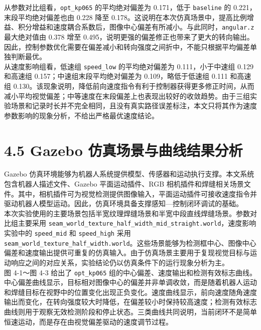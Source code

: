 \documentclass[UTF8,a4paper,12pt]{ctexrep}
\begin{document}
从参数对比组看，\texttt{opt\_kp065} 的平均绝对偏差为 0.171，低于 \texttt{baseline} 的 0.221，末段平均绝对偏差也由 0.228 降至 0.178。这说明在本次仿真场景中，提高比例增益、积分增益和速度耦合系数后，图像中心偏差有所减小。与此同时，\texttt{angular.z} 最大绝对值由 0.378 增至 0.495，说明更强的偏差修正也带来了更大的转向输出。因此，控制参数优化需要在偏差减小和转向强度之间折中，不能只根据平均偏差单独判断最优。\\

从速度影响组看，低速组 \texttt{speed\_low} 的平均绝对偏差为 0.111，小于中速组 0.129 和高速组 0.157；中速组末段平均绝对偏差为 0.109，略低于低速组 0.111 和高速组 0.130。该现象说明，降低前向速度指令有利于控制器获得更多修正时间，从而减小平均视觉偏差；中等速度在末段偏差上也表现出较好的收敛趋势。由于三组实验场景和记录时长并不完全相同，且没有真实路径误差标注，本文只将其作为速度参数影响的现象分析，不给出严格最优速度结论。\\

\section{4.5 Gazebo 仿真场景与曲线结果分析}

Gazebo 仿真环境能够为机器人系统提供模型、传感器和运动执行支撑。本文系统包含机器人描述文件、Gazebo 平面运动插件、RGB 相机插件和焊缝相关场景文件。其中，相机插件可为视觉检测提供图像输入，平面运动插件可接收速度指令并驱动机器人模型运动。因此，仿真环境具备支撑感知—控制闭环调试的基础。\\

本次实验使用的主要场景包括半宽纹理焊缝场景和半宽中段直线焊缝场景。参数对比组主要采用 \texttt{seam\_world\_texture\_half\_width\_mid\_straight.world}，速度影响实验中的 \texttt{speed\_mid} 和 \texttt{speed\_high} 采用 \texttt{seam\_world\_texture\_half\_width.world}。这些场景能够为检测框中心、图像中心偏差和速度输出提供可重复的仿真输入。由于仿真场景主要用于复现视觉目标与运动响应之间的对应关系，实验结论仍以仿真条件下的运行现象分析为主。\\

图 4-1～图 4-3 给出了 \texttt{opt\_kp065} 组的中心偏差、速度输出和检测有效标志曲线。中心偏差曲线显示，目标相对图像中心的偏差并非单调收敛，而是随着机器人运动和焊缝目标在视野中的位置变化出现正负变化。速度曲线显示，前向速度随角速度输出而变化，在转向强度较大时降低，在偏差较小时保持较高速度；检测有效标志曲线则用于观察无效检测阶段和停止状态。三类曲线共同说明，当前闭环不是简单恒速运动，而是存在由视觉偏差驱动的速度调节过程。\\
\end{document}
